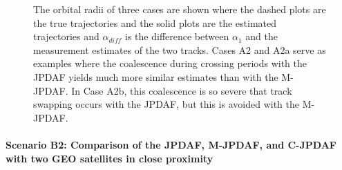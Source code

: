 \begin{figure}
{
\centerline{
	}
\centerline{
	}
\centerline{
	}
}
\caption{The orbital radii of three cases are shown where the dashed plots are the true trajectories and the solid plots are the estimated trajectories and $\alpha_{diff}$ is the difference between $\alpha_{1}$ and the measurement estimates of the two tracks.
Cases A2 and A2a serve as examples where the coalescence during crossing periods with the JPDAF yields much more similar estimates than with the M-JPDAF.
In Case A2b, this coalescence is so severe that track swapping occurs with the JPDAF, but this is avoided with the M-JPDAF.
}\label{fig:A2}
\end{figure}








































\paragraph*{Scenario B2: Comparison of the JPDAF, M-JPDAF, and C-JPDAF with two GEO satellites in close proximity}\ 

